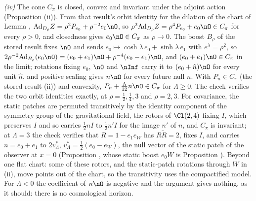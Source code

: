 \emph{(iv)} The cone $C_{\pi}$ is closed, convex and invariant under the adjoint action (Proposition (ii)). From that result's orbit identity for the dilation of the chart of Lemma , $\mathrm{Ad}_{D_{\rho}}Z = \rho^{2}P_{e_{0}} + \rho^{-2}e_{0}\nO$, so $\rho^{2}\mathrm{Ad}_{D_{\rho}}Z = \rho^{4}P_{e_{0}} + e_{0}\nO \in C_{\pi}$ for every $\rho > 0$, and closedness gives $e_{0}\nO \in C_{\pi}$ as $\rho \to 0$. The boost $B_{\rho}$ of the stored result fixes $\nO$ and sends $e_{0} \mapsto \cosh\lambda\,e_{0} + \sinh\lambda\,e_{1}$ with $e^{\lambda} = \rho^{2}$, so $2\rho^{-2}\mathrm{Ad}_{B_{\rho}}(e_{0}\nO) = (e_{0} + e_{1})\nO + \rho^{-4}(e_{0} - e_{1})\nO$, and $(e_{0} + e_{1})\nO \in C_{\pi}$ in the limit; rotations fixing $e_{0}$, $\nO$ and $\nInf$ carry it to $(e_{0} + \hat n)\nO$ for every unit $\hat n$, and positive scaling gives $n\nO$ for every future null $n$. With $P_{n} \in C_{\pi}$ (the stored result (ii)) and convexity, $P_{n} + \tfrac{\Lambda}{12}n\nO \in C_{\pi}$ for $\Lambda \ge 0$. The check verifies the two orbit identities exactly, at $\rho = \tfrac12, \tfrac14, 3$ and $\rho = 2, 3$. For covariance, the static patches are permuted transitively by the identity component of the symmetry group of the gravitational field, the rotors of $\Cl(2,4)$ fixing $I$, which preserves $I$ and so carries $\tfrac12 nI$ to $\tfrac12 n'I$ for the image $n'$ of $n$, and $C_{\pi}$ is invariant; at $\Lambda = 3$ the check verifies that $R = 1 - e_{1}e_{W}$ has $R\tilde R = 2$, fixes $I$, and carries $n = e_{0} + e_{1}$ to $2v_{\Lambda}^{*}$, $v_{\Lambda}^{*} = \tfrac12(e_{0} - e_{W})$, the null vector of the static patch of the observer at $x = 0$ (Proposition , whose static boost $e_{0}W$ is Proposition ). Beyond one flat chart: some of these rotors, and the static-patch rotations through $W$ in (ii), move points out of the chart, so the transitivity uses the compactified model. For $\Lambda < 0$ the coefficient of $n\nO$ is negative and the argument gives nothing, as it should: there is no cosmological horizon.

